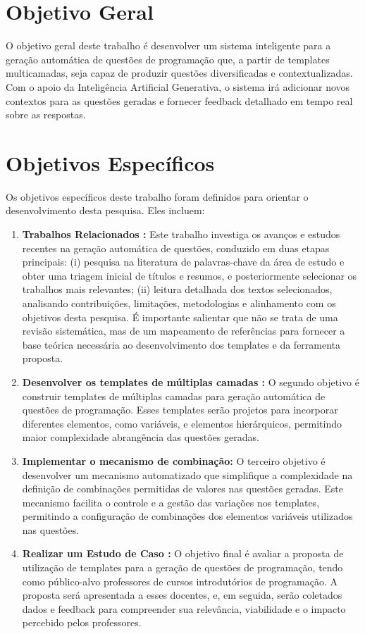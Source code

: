 \section{Objetivo Geral}

O objetivo geral deste trabalho é desenvolver um sistema inteligente para a geração automática de questões de programação que, a partir de templates multicamadas, seja capaz de produzir questões diversificadas e contextualizadas. Com o apoio da Inteligência Artificial Generativa, o sistema irá adicionar novos contextos para as questões geradas e fornecer feedback detalhado em tempo real sobre as respostas.

\section{Objetivos Específicos}

Os objetivos específicos deste trabalho foram definidos para orientar o desenvolvimento desta pesquisa. Eles incluem:

\begin{enumerate}[label=\textbf{\alph*)}]
    \item \textbf{Trabalhos Relacionados :} Este trabalho investiga os avanços e estudos recentes na geração automática de questões, conduzido em duas etapas principais: (i) pesquisa na literatura de palavras-chave da área de estudo e obter uma triagem inicial de títulos e resumos, e posteriormente selecionar os trabalhos mais relevantes; (ii) leitura detalhada dos textos selecionados, analisando contribuições, limitações, metodologias e alinhamento com os objetivos desta pesquisa. É importante salientar que não se trata de uma revisão sistemática, mas de um mapeamento de referências para fornecer a base teórica necessária ao desenvolvimento dos templates e da ferramenta proposta. 
    \item \textbf{Desenvolver os templates de múltiplas camadas :}  O segundo objetivo é construir templates de múltiplas camadas para geração automática de questões de programação. Esses templates serão projetos para incorporar diferentes elementos, como variáveis, e elementos hierárquicos, permitindo maior complexidade abrangência das questões geradas. 
    \item \textbf{Implementar o mecanismo de combinação:} O terceiro objetivo é desenvolver um mecanismo automatizado que simplifique a complexidade na definição de combinações permitidas de valores nas questões geradas. Este mecanismo facilita o controle e a gestão das variações nos templates, permitindo a configuração de combinações dos elementos variáveis utilizados nas questões.
    \item \textbf{Realizar um Estudo de Caso :}  
O objetivo final é avaliar a proposta de utilização de templates para a geração de questões de programação, tendo como público-alvo professores de cursos introdutórios de programação. A proposta será apresentada a esses docentes, e, em seguida, serão coletados dados e feedback para compreender sua relevância, viabilidade e o impacto percebido pelos professores.

 
\end{enumerate}


